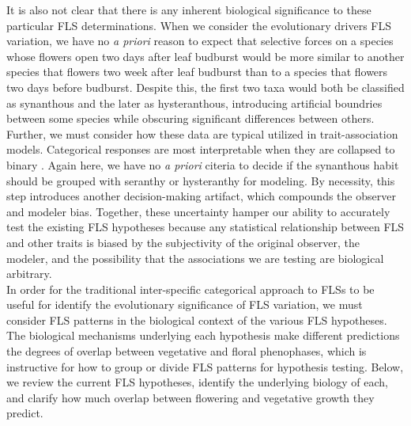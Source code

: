 \documentclass[12pt]{article}\usepackage[]{graphicx}\usepackage[]{color}
\begin{document}
\indent It is also not clear that there is any inherent biological significance to these particular FLS determinations. When we consider the evolutionary drivers FLS variation, we have no \textit{a priori} reason to expect that selective forces on a species whose flowers open two days after leaf budburst would be more similar to another species that flowers two week after leaf budburst than to a species that flowers two days before budburst. Despite this, the first two taxa would both be classified as synanthous and the later as hysteranthous, introducing artificial boundries between some species while obscuring significant differences between others.\\

\indent Further, we must consider how these data are typical utilized in trait-association models. Categorical responses are most interpretable when they are collapsed to binary \citep[see][]{Gougherty2018}.  Again here, we have no \textit{a priori} citeria to decide if the synanthous habit should be grouped with seranthy or hysteranthy for modeling. By necessity, this step introduces another decision-making artifact, which compounds the observer and modeler bias. Together, these uncertainty hamper our ability to accurately test the existing FLS hypotheses because any statistical relationship between FLS and other traits is biased by the subjectivity of the original observer, the modeler, and the possibility that the associations we are testing are biological arbitrary.\\

\indent In order for the traditional inter-specific categorical approach to FLSs to be useful for identify the evolutionary significance of FLS variation, we must consider FLS patterns in the biological context of the various FLS hypotheses. The biological mechanisms underlying each hypothesis make different predictions the degrees of overlap between vegetative and floral phenophases, which is instructive for how to group or divide FLS patterns for hypothesis testing. Below, we review the current FLS hypotheses, identify the underlying biology of each, and clarify how much overlap between flowering and vegetative growth they predict.
\end{document}
